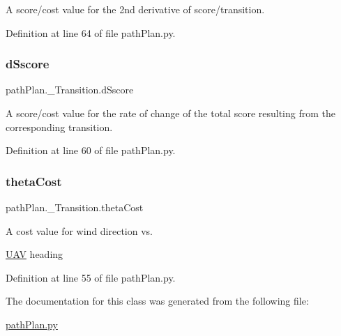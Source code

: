 A score/cost value for the 2nd derivative of score/transition. 



Definition at line 64 of file path\+Plan.\+py.

\mbox{\label{classpath_plan_1_1___transition_afa609d3874eb34ae2aa3efa67d762896}} 
\subsubsection{\texorpdfstring{d\+Sscore}{dSscore}}
{\footnotesize\ttfamily path\+Plan.\+\_\+\+Transition.\+d\+Sscore}



A score/cost value for the rate of change of the total score resulting from the corresponding transition. 



Definition at line 60 of file path\+Plan.\+py.

\mbox{\label{classpath_plan_1_1___transition_a405e375ebe2b2a5d66b50721c338c6e8}} 
\subsubsection{\texorpdfstring{theta\+Cost}{thetaCost}}
{\footnotesize\ttfamily path\+Plan.\+\_\+\+Transition.\+theta\+Cost}



A cost value for wind direction vs. 

\mbox{\hyperlink{classpath_plan_1_1_u_a_v}{U\+AV}} heading 

Definition at line 55 of file path\+Plan.\+py.



The documentation for this class was generated from the following file\+:\begin{DoxyCompactItemize}
\item 
\mbox{\hyperlink{path_plan_8py}{path\+Plan.\+py}}\end{DoxyCompactItemize}
